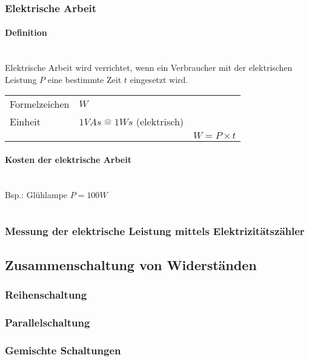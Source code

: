 \subsubsection{Elektrische Arbeit}

\paragraph{Definition}~\\
Elektrische Arbeit wird verrichtet, wenn ein Verbraucher mit der elektrischen Leistung $P$ eine bestimmte Zeit $t$ eingesetzt wird.
\begin{tabular}{lll}
Formelzeichen & $W$ &\\
Einheit & $1VAs \widehat{=} 1Ws$ (elektrisch) &\\
& & $W = P\times t$\\
\end{tabular}

\paragraph{Kosten der elektrische Arbeit}~\\
Bsp.: Glühlampe $P = 100W$
\begin{tabular}{lll}

\end{tabular}



\subsubsection{Messung der elektrische Leistung mittels Elektrizitätszähler}
	

\subsection{Zusammenschaltung von Widerständen}
\subsubsection{Reihenschaltung}
\subsubsection{Parallelschaltung}
\subsubsection{Gemischte Schaltungen}
